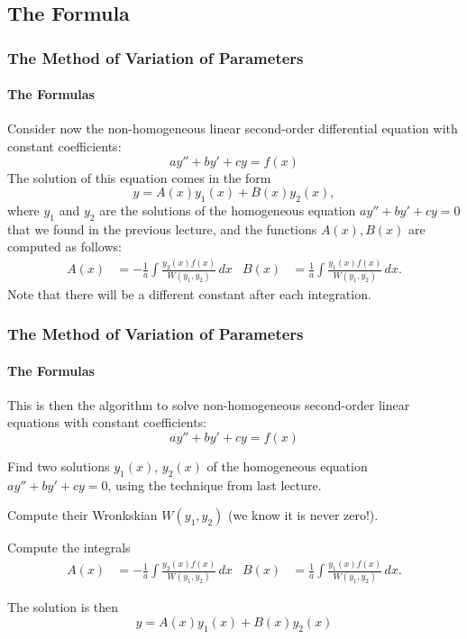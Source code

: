 \documentclass[9pt,xcolor=x11names,compress]{beamer}
\begin{document}
\subsection{The Formula}

\begin{frame}\frametitle{The Method of Variation of Parameters}
\framesubtitle{The Formulas}
   Consider now the \alert{non-homogeneous} linear second-order differential equation with constant coefficients:
   \begin{equation*}
   	ay''+by'+cy=f(x)
   \end{equation*}
\pause The solution of this equation comes in the form
\begin{equation*}
   	y=A(x)y_1(x)+B(x)y_2(x),
   \end{equation*}   
   where $y_1$ and $y_2$ are the solutions of the homogeneous equation $ay''+by'+cy=0$ that we found in the previous lecture, and the functions $A(x), B(x)$ are computed as follows:
   \begin{align*}
   	A(x) &= -\frac{1}{a} \int \frac{y_2(x) f(x)}{W(y_1,y_2)}\, dx 
   	&B(x) &= \frac{1}{a} \int \frac{y_1(x) f(x)}{W(y_1,y_2)}\, dx.
   \end{align*}
   Note that there will be a different constant after each integration.
\end{frame}

\begin{frame}\frametitle{The Method of Variation of Parameters}
\framesubtitle{The Formulas}
This is then the algorithm to solve non-homogeneous second-order linear equations with constant coefficients:
\begin{equation*}
	ay''+by'+cy=f(x)
\end{equation*}
\pause
\begin{description}[<+->]
	\item[\textbf{Step \#1:}] Find two solutions $y_1(x)$, $y_2(x)$ of the homogeneous equation $ay''+by'+cy=0$, using the technique from last lecture.
	\item[\textbf{Step \#2:}] Compute their Wronkskian $W(y_1,y_2)$ (we know it is never zero!).
	\item[\textbf{Step \#3:}] Compute the integrals 
   \begin{align*}
   	A(x) &= -\frac{1}{a} \int \frac{y_2(x) f(x)}{W(y_1,y_2)}\, dx 
   	&B(x) &= \frac{1}{a} \int \frac{y_1(x) f(x)}{W(y_1,y_2)}\, dx.
   \end{align*}
	\item[\textbf{Step \#4:}] The solution is then
	\begin{equation*}
		y=A(x)y_1(x)+B(x)y_2(x)	
	\end{equation*}
\end{description}
\end{frame}
\end{document}
